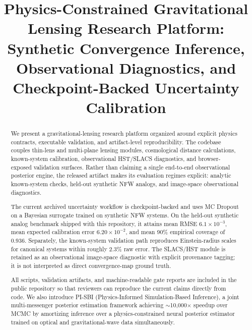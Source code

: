 \documentclass[journal]{IEEEtran}
\begin{document}
\title{Physics-Constrained Gravitational Lensing Research Platform:\\
       Synthetic Convergence Inference, Observational Diagnostics, and\\
       Checkpoint-Backed Uncertainty Calibration}

\author{
}

\maketitle

\begin{abstract}
We present a gravitational-lensing research platform organized around explicit
physics contracts, executable validation, and artifact-level reproducibility.
The codebase couples thin-lens and multi-plane lensing modules, cosmological
distance calculations, known-system calibration, observational HST/SLACS
diagnostics, and browser-exposed validation surfaces. Rather than claiming a
single end-to-end observational posterior engine, the released artifact makes
its evaluation regimes explicit: analytic known-system checks, held-out
synthetic NFW analogs, and image-space observational diagnostics.

The current archived uncertainty workflow is checkpoint-backed and uses
MC Dropout on a Bayesian surrogate trained on synthetic NFW systems. On the
held-out synthetic analog benchmark shipped with this repository, it attains
mean RMSE $6.1\times10^{-3}$, mean expected calibration error $6.20\times10^{-2}$,
and mean 90\% empirical coverage of 0.936. Separately, the known-system
validation path reproduces Einstein-radius scales for canonical systems within
roughly 2.3\% raw error. The SLACS/HST module is retained as an observational
image-space diagnostic with explicit provenance tagging; it is not interpreted
as direct convergence-map ground truth.

All scripts, validation artifacts, and machine-readable gate reports are
included in the public repository so that reviewers can reproduce the current
claims directly from code. We also introduce PI-SBI (Physics-Informed
Simulation-Based Inference), a joint multi-messenger posterior estimation
framework achieving $\sim$10,000$\times$ speedup over MCMC by amortizing
inference over a physics-constrained neural posterior estimator trained on
optical and gravitational-wave data simultaneously.
\end{abstract}
\end{document}
